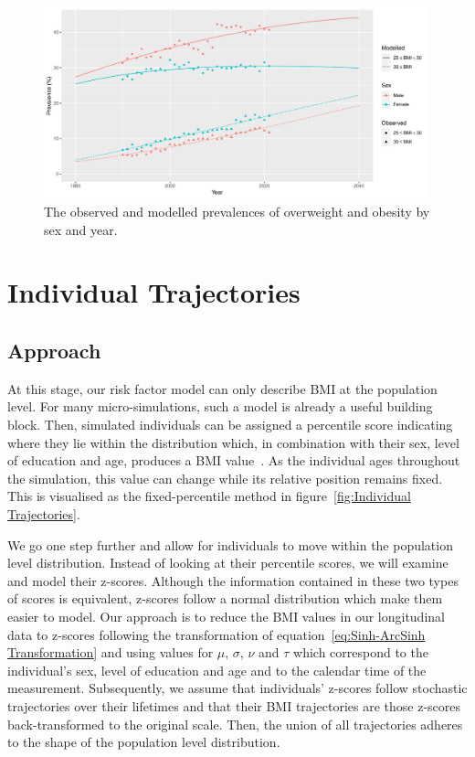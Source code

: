 \documentclass{imammb}
\numberwithin{equation}{section}
\begin{document}
\begin{figure}[!h]
\centering
\includegraphics[width=0.99\textwidth] {"Figures/Historical-Trend.pdf"}
\caption{The observed and modelled prevalences of overweight and obesity by sex and year.}
\label{fig:Historical Trend}
\vspace*{-9pt}
\end{figure}

\section{Individual Trajectories}
\label{sec:Individual Trajectories}

\subsection{Approach}
\label{sec:Individual Trajectories/Approach}

At this stage, our risk factor model can only describe BMI at the population level. For many micro-simulations, such a model is already a useful building block. Then, simulated individuals can be assigned a percentile score indicating where they lie within the distribution which, in combination with their sex, level of education and age, produces a BMI value~\citep{McPherson2007, OECD2019}. As the individual ages throughout the simulation, this value can change while its relative position remains fixed. This is visualised as the fixed-percentile method in figure~\ref{fig:Individual Trajectories}.

We go one step further and allow for individuals to move within the population level distribution. Instead of looking at their percentile scores, we will examine and model their z-scores. Although the information contained in these two types of scores is equivalent, z-scores follow a normal distribution which make them easier to model. Our approach is to reduce the BMI values in our longitudinal data to z-scores following the transformation of equation~\ref{eq:Sinh-ArcSinh Transformation} and using values for $\mu$, $\sigma$, $\nu$ and $\tau$ which correspond to the individual's sex, level of education and age and to the calendar time of the measurement. Subsequently, we assume that individuals' z-scores follow stochastic trajectories over their lifetimes and that their BMI trajectories are those z-scores back-transformed to the original scale. Then, the union of all trajectories adheres to the shape of the population level distribution.
\end{document}
